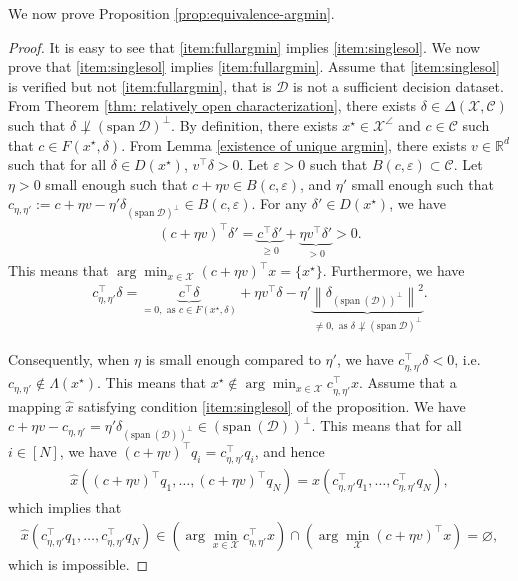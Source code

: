 \documentclass[11pt]{article}
\theoremstyle{plain}
\theoremstyle{definition}
\newcommand{\R}[0]{\mathbb R}
\newcommand{\Vect}{\mathrm{span}~}
\newcommand{\norm}[1]{\left\lVert#1\right\rVert}
\newcommand{\sufficient}{sufficient decision dataset}
\newcommand{\cX}{\mathcal{X}}
\newcommand{\cC}{\mathcal{C}}
\newcommand{\cD}{\mathcal{D}}
\begin{document}
We now prove Proposition \ref{prop:equivalence-argmin}.
\begin{proof}

    
    It is easy to see that \ref{item:fullargmin} implies \ref{item:singlesol}. We now prove that \ref{item:singlesol} implies \ref{item:fullargmin}. Assume that \ref{item:singlesol} is verified but not \ref{item:fullargmin}, that is $\cD$ is not a \sufficient{}. From Theorem \ref{thm: relatively open characterization}, there exists $\delta\in \Delta(\cX,\cC)$ such that $\delta \not\perp  (\Vect \cD)^\perp$. By definition, there exists $x^\star \in \cX^\angle$ and $c\in \cC$ such that $c\in F(x^\star,\delta)$. From Lemma \ref{existence of unique argmin}, there exists $v\in \R^d$ such that for all $\delta \in D (x^\star)$, $v^\top \delta >0$. Let $\varepsilon>0$ such that $B(c,\varepsilon)\subset \cC$. Let $\eta>0$ small enough such that $c+\eta v\in B(c,\varepsilon)$, and $\eta '$ small enough such that $c_{\eta,\eta'}:=c+\eta v - \eta '\delta_{(\Vect \cD)^\perp}\in B(c,\varepsilon)$. For any $\delta' \in D(x^\star)$, we have
    \begin{align*}
        (c+\eta v)^\top \delta' = \underbrace{c^\top \delta'}_{\geq 0} +\underbrace{\eta v^\top \delta'}_{>0} >0.
    \end{align*}
    This means that $\arg\min_{x\in \cX}(c+\eta v)^\top x=\{x^\star\}$. Furthermore, we have 
    \begin{align*}
        c_{\eta,\eta'}^\top \delta = \underbrace{c^\top \delta}_{=0, \text{ as }c\in F(x^\star,\delta)} +\eta v^\top \delta - \eta ' \underbrace{\norm{\delta_{ (\Vect(\cD))^\perp}\textbf{}}^2}_{\neq 0, \text{ as }\delta \not\perp  (\Vect \cD)^\perp }.
    \end{align*}
    
    Consequently, when $\eta$ is small enough compared to $\eta'$, we have $c_{\eta,\eta'}^\top \delta<0$, i.e. $c_{\eta,\eta'} \not\in \Lambda(x^\star)$. This means that $x^\star \not\in \arg\min_{x\in \cX}c_{\eta,\eta'}^\top x $. Assume that a mapping $\hat{x}$ satisfying condition \ref{item:singlesol} of the proposition. We have $c+\eta v-c_{\eta,\eta'}=\eta'\delta_{ (\Vect(\cD))^\perp}\in (\Vect(\cD))^\perp$. This means that for all $i\in [N]$, we have $(c+\eta v)^\top q_i=c_{\eta,\eta'}^\top q_i$, and hence 
    \begin{align*}
        \hat{x}((c+\eta v)^\top q_1,\dots,(c+\eta v)^\top q_N)=\hat{x}(c_{\eta,\eta'}^\top q_1,\dots,c_{\eta,\eta'}^\top q_N),
    \end{align*}
    which implies that
    \begin{align*}
        \hat{x}(c_{\eta,\eta'}^\top q_1,\dots,c_{\eta,\eta'}^\top q_N)\in \left(\arg\min_{x\in \cX}c_{\eta,\eta'}^\top x\right)\cap \left(\arg\min_{\cX}(c+\eta v)^\top x\right)=\varnothing,
    \end{align*}
    which is impossible.

\end{proof}
\end{document}
